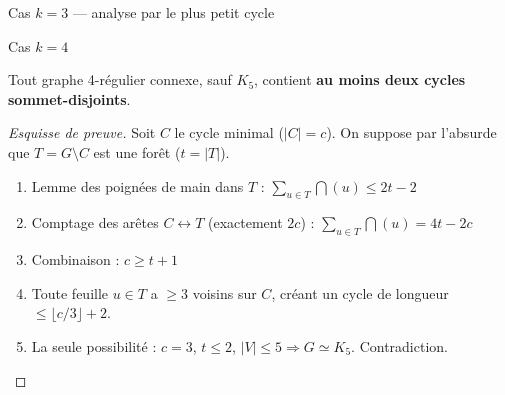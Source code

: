 \begin{frame}{Cas $k = 3$ --- analyse par le plus petit cycle}
  \begin{figure}[H]
      \begin{floatrow}

          

          

      \end{floatrow}
  \end{figure}
\end{frame}

\begin{frame}{Cas $k = 4$}
  \begin{lemma}
    Tout graphe 4-r\'egulier connexe, sauf $K_5$, contient \textbf{au moins deux cycles sommet-disjoints}.
  \end{lemma}

  \begin{proof}[Esquisse de preuve]
    Soit $C$ le cycle minimal ($|C| = c$). On suppose par l'absurde que $T = G \setminus C$ est une for\^et ($t = |T|$).
    \begin{enumerate}
      \item Lemme des poign\'ees de main dans $T$ :
        $\displaystyle\sum_{u \in T} \dint(u) \leq 2t - 2$
      \item Comptage des ar\^etes $C \leftrightarrow T$ (exactement $2c$) :
        $\displaystyle\sum_{u \in T} \dint(u) = 4t - 2c$
      \item Combinaison : $c \geq t+1$
      \item Toute feuille $u \in T$ a $\geq 3$ voisins sur $C$, cr\'eant un cycle de longueur $\leq \lfloor c/3 \rfloor + 2$.
      \item La seule possibilit\'e : $c = 3$, $t \leq 2$, $|V| \leq 5 \Rightarrow G \simeq K_5$. \alert{Contradiction.}
    \end{enumerate}
  \end{proof}
\end{frame}

